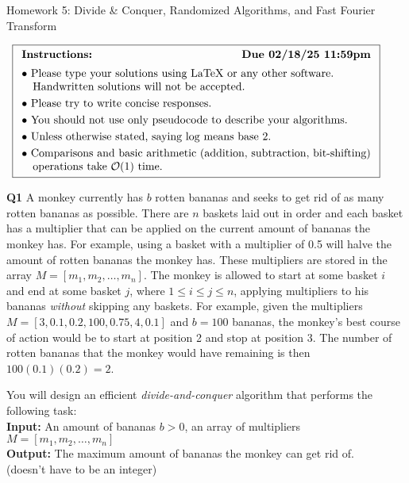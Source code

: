 \documentclass[12pt]{article}
\newcommand{\question}[3][Q]{
\begin{description}
\item \textbf{#1{#2}} #3
\end{description}
}
\renewcommand\maketitle{
\thispagestyle{firstpage}
\begin{center}
\fontsize{20}{0}\selectfont
\assignmentTitle
\end{center}
\begin{center}
$\begin{array}{l}\fbox{$\begin{array}{l}\textbf{Instructions: } \hfill \textbf{Due \dueOn} \\[0.5em] \bullet\ \text{Please type your solutions using LaTeX or any other software.} \\ \hspace{1em} \text{Handwritten solutions will not be accepted.} \\[0.3em] \bullet\ \text{Please try to write concise responses.} \\[0.3em]  \bullet\ \text{You should not use only pseudocode to describe your algorithms.} \\[0.3em] \bullet\ \text{Unless otherwise stated, saying $\log$ means base 2.} \\[0.3em] \bullet\ \text{Comparisons and basic arithmetic (addition, subtraction, bit-shifting)} \\ \hspace{1em}\text{operations take $\bigO(1)$ time.} \end{array}$} \end{array}$ \end{center}}
\newcommand{\bigO}{\mathcal{O}}
\begin{document}
\newcommand{\assignmentTitle}{Homework 5: Divide \& Conquer, Randomized Algorithms, and Fast Fourier Transform}
\newcommand{\dueOn}{02/18/25 11:59pm}




\newcommand{\studentName}{Your name}
\newcommand{\collaborators}{any collaborators}

\maketitle

\newpage

\question{1}{
    A monkey currently has $b$ rotten bananas and seeks to get rid of as many rotten bananas as possible. There are $n$ baskets laid out in order and each basket has a multiplier that can be applied on the current amount of bananas the monkey has. For example, using a basket with a multiplier of 0.5 will halve the amount of rotten bananas the monkey has. These multipliers are stored in the array $M = [m_1, m_2, \dots, m_n]$. The monkey is allowed to start at some basket $i$ and end at some basket $j$, where $1 \le i \le j \le n$, applying multipliers to his bananas \textit{without} skipping any baskets. For example, given the multipliers $M = [3, 0.1, 0.2, 100, 0.75, 4, 0.1]$ and $b = 100$ bananas, the monkey's best course of action would be to start at position 2 and stop at position 3. The number of rotten bananas that the monkey would have remaining is then $100(0.1)(0.2) = 2$. 

    You will design an efficient \textit{divide-and-conquer} algorithm that performs the following task:\\

    \textbf{Input:} An amount of bananas $b > 0$, an array of multipliers $M = [m_1, m_2, \dots, m_n]$\\
    \textbf{Output:} The maximum amount of bananas the monkey can get rid of. \\
    \phantom{.}\hspace{4.2em}(doesn't have to be an integer)
}
\end{document}

